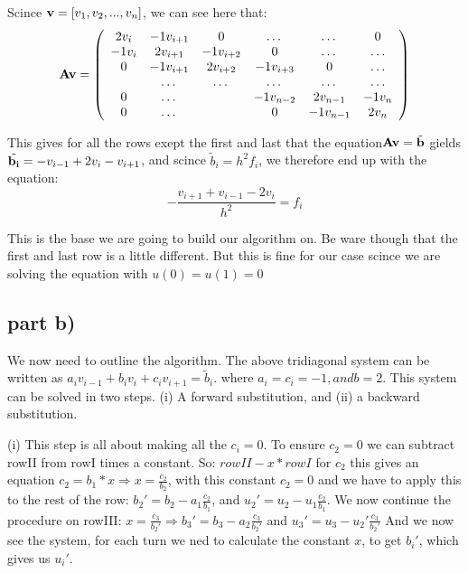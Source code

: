 \documentclass[norsk,a4paper,12pt]{article}
\begin{document}
Scince ${\bf v} = [v_1, v_2, ..., v_n]$, we can see here that:
\begin{equation}
    {\bf A}{\bf v} = \left(\begin{array}{cccccc}
                           2v_i& -1v_{i+1}& 0 &\dots   & \dots &0 \\
                           -1v_i & 2v_{i+1} & -1v_{i+2} &0 &\dots &\dots \\
                           0&-1v_{i+1} &2v_{i+2} & -1v_{i+3} & 0 & \dots \\
                           & \dots   & \dots &\dots   &\dots & \dots \\
                           0&\dots   &  &-1v_{n-2} &2v_{n-1}& -1v_n \\
                           0&\dots    &  & 0  &-1v_{n-1} & 2v_{n} \\
                      \end{array} \right)
\end{equation}

This gives for all the rows exept the first and last that the equation${\bf A}{\bf v} = \tilde{{\bf b}}$ gields
$\tilde{{\bf b_i}} = -v_{i-1} + 2v_{i} - v_{i+1}$, and scince $\tilde{b}_i=h^2f_i$, we therefore end up with the equation:
\begin{equation}
 -\frac{v_{i+1}+v_{i-1}-2v_i}{h^2} = f_i
\end{equation}

This is the base we are going to build our algorithm on. Be ware though that the first and last row is a little different.
But this is fine for our case scince we are solving the equation with $u(0) = u(1) = 0$

\subsection*{part b)}

We now need to outline the algorithm. The above tridiagonal system can be written as $a_iv_{i-1}+b_iv_i+c_iv_{i+1} = \tilde{b}_i$.
where $a_i = c_i = -1, and b = 2$. This system can be solved in two steps. (i) A forward substitution, and (ii) a backward substitution. \newline

(i)\newline
This step is all about making all the $c_i = 0$. To ensure $c_2 = 0$ we can subtract rowII from rowI times a constant. So:
$rowII - x*rowI$ for $c_2$ this gives an equation $c_2 = b_1*x \Rightarrow x = \frac{c_2}{b_2}$, with this constant $c_2 = 0$
and we have to apply this to the rest of the row: $b_2' = b_2 - a_1\frac{c_2}{b_1}$, and $u_2' = u_2 - u_1\frac{c_2}{b_1}$.
We now continue the procedure on rowIII: $x = \frac{c_3}{b_2'} \Rightarrow b_3' = b_3 - a_2\frac{c_3}{b_2'}$ and $u_3' = u_3 - u_2'\frac{c_3}{b_2'}$
And we now see the system, for each turn we ned to calculate the constant $x$, to get $b_i'$, which gives us $u_i'$. \newline
\end{document}
